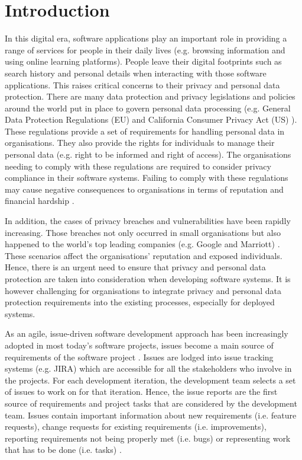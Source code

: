 \section{Introduction} \label{sec:intro}

In this digital era, software applications play an important role in providing a range of services for people in their daily lives (e.g. browsing information and using online learning platforms). People leave their digital footprints such as search history and personal details when interacting with those software applications. This raises critical concerns to their privacy and personal data protection. There are many data protection and privacy legislations and policies around the world put in place to govern personal data processing (e.g. General Data Protection Regulations (EU) \cite{OfficeJournaloftheEuropeanUnion;2016} and California Consumer Privacy Act (US) \cite{StateofCaliforniaDepartmentofJustice2018}). These regulations provide a set of requirements for handling personal data in organisations. They also provide the rights for individuals to manage their personal data (e.g. right to be informed and right of access). The organisations needing to comply with these regulations are required to consider privacy compliance in their software systems. Failing to comply with these regulations may cause negative consequences to organisations in terms of reputation and financial hardship \cite{Data, EuropeanCommission2019, CNET, PrivacyAffa}. 

In addition, the cases of privacy breaches and vulnerabilities have been rapidly increasing. Those breaches not only occurred in small organisations but also happened to the world's top leading companies (e.g. Google and Marriott) \cite{InformationCommissionersOffice2020, ICOMarriott, Swinhoe2020}. These scenarios affect the organisations' reputation and exposed individuals. Hence, there is an urgent need to ensure that privacy and personal data protection are taken into consideration when developing software systems. It is however challenging for organisations to integrate privacy and personal data protection requirements into the existing processes, especially for deployed systems.

As an agile, issue-driven software development approach has been increasingly adopted in most today's software projects, issues become a main source of requirements of the software project \cite{Choetkiertikul}. Issues are lodged into issue tracking systems (e.g. JIRA) which are accessible for all the stakeholders who involve in the projects. For each development iteration, the development team selects a set of issues to work on for that iteration. Hence, the issue reports are the first source of requirements and project tasks that are considered by the development team. Issues contain important information about new requirements (i.e. feature requests), change requests for existing requirements (i.e. improvements), reporting requirements not being properly met (i.e. bugs) or representing work that has to be done (i.e. tasks) \cite{Choetkiertikul2018, Choetkiertikul}. 

